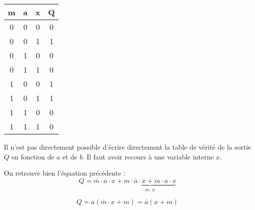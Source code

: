 \begin{minipage}[c]{.3\linewidth}
\begin{center}
\begin{tabular}{|c|c|c||c|}
\hline
m & a & x & Q \\
\hline \hline
0 & 0 & 0 & 0 \\\hline
0 & 0 & 1 & 1 \\\hline
0 & 1 & 0 & 0 \\\hline
0 & 1 & 1 & 0 \\\hline
1 & 0 & 0 & 1 \\\hline
1 & 0 & 1 & 1 \\\hline
1 & 1 & 0 & 0 \\\hline
1 & 1 & 1 & 0 \\\hline
\end{tabular}
\end{center}
\end{minipage} \hfill
\begin{minipage}[c]{.6\linewidth}
Il  n'est pas directement possible d'écrire directement la table de vérité de la sortie $Q$ en fonction de $a$ et de $b$. Il faut avoir recours à une variable interne $x$. 

On retrouve bien l'équation précédente : 
$$
Q = \overline{m}\cdot \overline{a} \cdot x + \underbrace{m\cdot \overline{a} \cdot \overline{x} 
+ m\cdot \overline{a} \cdot x}_{m\cdot \overline{a} } 
$$

$$Q
= \overline{a} \left(\overline{m} \cdot x + m\right)
= \overline{a} \left( x + m\right)
$$

\end{minipage}
%
%   
%  
%

